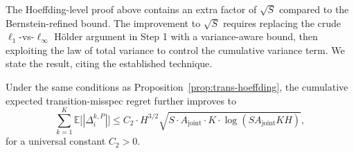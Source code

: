 The Hoeffding-level proof above contains an extra factor of $\sqrt{S}$ compared to the Bernstein-refined bound. The improvement to $\sqrt{S}$ requires replacing the crude $\ell_1$-vs-$\ell_\infty$ Hölder argument in Step 1 with a variance-aware bound, then exploiting the law of total variance to control the cumulative variance term. We state the result, citing the established technique.

\begin{proposition}
\label{prop:trans-bernstein}
Under the same conditions as Proposition~\ref{prop:trans-hoeffding}, the cumulative expected transition-misspec regret further improves to
\begin{equation}
\label{eq:trans-bernstein}
\sum_{k=1}^K \mathbb{E}\big[|\Delta_i^{k,P}|\big] \leq C_2 \cdot H^{3/2} \sqrt{S \cdot A_{\mathrm{joint}} \cdot K \cdot \log(SA_{\mathrm{joint}}KH)},
\end{equation}
for a universal constant $C_2 > 0$.
\end{proposition}

